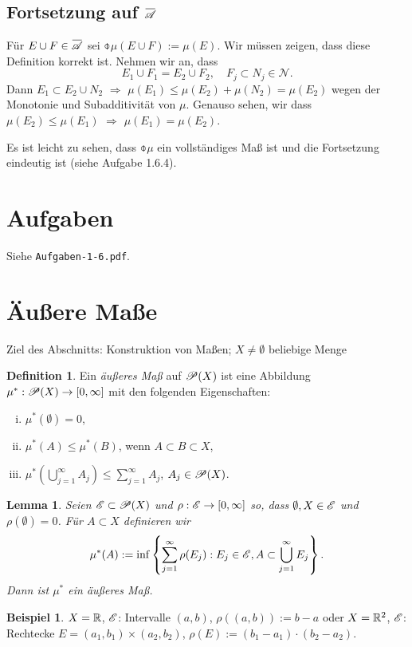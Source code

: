 \documentclass[
 a4paper,
 12pt,
 parskip=half
 ]{scrreprt}
\theoremstyle{plain}
\newtheorem{lem}[thm]{Lemma}
\theoremstyle{definition}
\newtheorem{defn}[thm]{Definition}
\newtheorem*{exmp*}{Beispiel}
\numberwithin{equation}{section}
\begin{document}
\subsection*{Fortsetzung auf $\obar{\mA}$}
 Für $E \cup F \in \obar{\mA}$ sei $\obar{\mu}(E \cup F) := \mu(E)$. Wir müssen zeigen, dass diese Definition korrekt ist. Nehmen wir an, dass 
 \[ E_1 \cup F_1 = E_2 \cup F_2, \quad F_j \subset N_j \in \mathcal{N}. \]
 Dann $E_1 \subset E_2 \cup N_2$ $\Rightarrow$ $\mu(E_1) \le \mu(E_2) + \mu(N_2) = \mu(E_2)$ wegen der Monotonie und Subadditivität von $\mu$. Genauso sehen, wir dass $\mu(E_2) \le \mu(E_1)$ $\Rightarrow$ $\mu(E_1) = \mu(E_2)$.
 
 Es ist leicht zu sehen,  dass $\obar{\mu}$ ein vollständiges Maß ist und die Fortsetzung eindeutig ist (siehe Aufgabe 1.6.4).

\section{Aufgaben}
Siehe \verb+Aufgaben-1-6.pdf+.

\section{Äußere Maße}
Ziel des Abschnitts: Konstruktion von Maßen; $X \ne \emptyset$ beliebige Menge

\begin{defn}
 Ein \emph{äußeres Maß} auf $\mathscr{P}(X)$ ist eine Abbildung $\mu^* : \mathscr{P}(X) \to [0,\infty]$ mit den folgenden Eigenschaften:
 \begin{enumerate}[(i)]
  \item $\mu^*(\emptyset) = 0$,
  \item $\mu^*( A ) \le \mu^*(B)$, wenn $A \subset B \subset X$,
  \item $\mu^*( \bigcup_{j=1}^\infty A_j ) \le \sum_{j=1}^\infty A_j$, $A_j \in \mathscr{P}(X)$.
 \end{enumerate}
\end{defn}

\begin{lem}
 Seien $\mathscr{E} \subset \mathscr{P}(X)$ und $\rho: \mathscr{E} \to [0, \infty]$ so, dass $\emptyset, X \in \mathscr{E}$ und $\rho(\emptyset) = 0$. Für $A \subset X$ definieren wir
 \[ \mu^*(A) := \inf \left\{ \sum_{j=1}^\infty \rho(E_j) : E_j \in \mathscr{E}, A \subset \bigcup_{j=1}^\infty E_j \right\}. \]
 Dann ist $\mu^*$ ein äußeres Maß.
\end{lem}

\begin{exmp*}
 $X = \mathbb{R}$, $\mathscr{E}$: Intervalle $(a,b)$, $\rho((a,b)) := b-a$ oder $X = \mathbb{R}^2$, $\mathscr{E}$: Rechtecke $E = (a_1, b_1) \times (a_2, b_2)$, $\rho(E) := (b_1 - a_1) \cdot (b_2 - a_2)$.
\end{exmp*}
\end{document}
